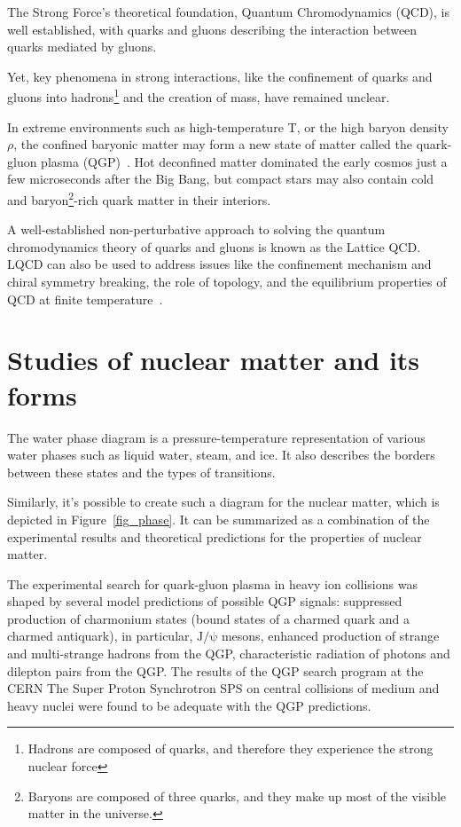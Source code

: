 \newpage

The Strong Force's theoretical foundation, Quantum Chromodynamics (QCD), is well established, with quarks and gluons describing the interaction between quarks mediated by gluons.

Yet, key phenomena in strong interactions, like the confinement of quarks and gluons into hadrons\footnote{Hadrons are composed of quarks, and therefore they experience the strong nuclear force} and the creation of mass, have remained unclear.

In extreme environments such as high-temperature T, or the high baryon density $\rho$, the confined baryonic matter may form a new state of matter called the quark-gluon plasma (\gls{QGP})~\cite{phase_diagram}. Hot deconfined matter dominated the early cosmos just a few microseconds after the Big Bang, but compact stars may also contain cold and baryon\footnote{Baryons are composed of three quarks, and they make up most of the visible matter in the universe.}-rich quark matter in their interiors.

A well-established non-perturbative approach to solving the quantum chromodynamics theory of quarks and gluons is known as the Lattice \gls{QCD}. LQCD can also be used to address issues like the confinement mechanism and chiral symmetry breaking, the role of topology, and the equilibrium properties of \gls{QCD} at finite temperature~\cite{lattice_qcd}. 

\section{Studies of nuclear matter and its forms}
The water phase diagram is a pressure-temperature representation of various water phases such as liquid water, steam, and ice. It also describes the borders between these states and the types of transitions. 

Similarly, it's possible to create such a diagram for the nuclear matter, which is depicted in Figure~\ref{fig_phase}. It can be summarized as a combination of the experimental results and theoretical predictions for the properties of nuclear matter.

The experimental search for quark-gluon plasma in heavy ion
collisions was shaped by several model predictions of possible \gls{QGP} signals: suppressed production of charmonium states (bound states of a charmed quark and a charmed antiquark), in particular, $\mathrm{J/\psi}$ mesons, enhanced production of strange and multi-strange hadrons from the \gls{QGP}, characteristic radiation of photons and dilepton pairs from the \gls{QGP}. The results of the QGP search program at the \gls{CERN} The Super Proton Synchrotron \gls{SPS} on central collisions of medium and heavy nuclei were found to be adequate with the QGP predictions.

